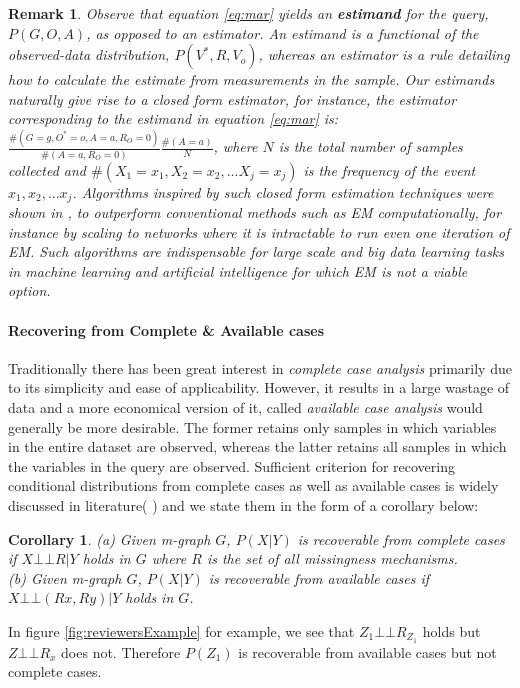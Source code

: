 \documentclass[12pt]{article}
\newcommand{\compos}{\mbox{$\bot\!\!\!\bot$}}
\newtheorem{cor}{Corollary}
\newtheorem{remark}{Remark}
\begin{document}
\begin{remark}
 Observe that equation \ref{eq:mar} yields an \textbf{estimand} for the query, $P(G,O,A)$, as opposed to an \textit{estimator}. An estimand is a functional of the observed-data distribution, $P(V^*,R,V_o)$, whereas an estimator is a rule detailing how to calculate the estimate from measurements in the sample. Our estimands naturally give rise to a closed form estimator, for instance, the estimator corresponding to the estimand in equation \ref{eq:mar} is: \\ $\frac{\#(G=g,O^*=o,A=a,R_O=0)}{\#(A=a,R_O=0)}\frac{\#(A=a)}{N}$, where $N$ is the total number of samples collected and $\#(X_1=x_1,X_2=x_2,...X_j=x_j)$ is the frequency of the event $x_1,x_2,...x_j$. 
Algorithms  inspired by such closed form estimation techniques 
were shown in \cite{mohan_learning}, to outperform conventional methods such as EM computationally, for instance by scaling to networks where it is intractable to run even one iteration of EM. Such algorithms are indispensable for large scale and big data learning tasks in machine learning and artificial intelligence for which EM is not a viable option.
\end{remark}

\paragraph{Recovering from Complete \& Available cases} Traditionally there has been great interest in \textit{complete case analysis } primarily due to its simplicity and ease of applicability. 
However, it results in a large wastage of data and
a more economical version of it, called \textit{available case analysis}
would generally be more desirable.
The former retains only samples in which
variables in the entire dataset are observed, whereas the latter retains all samples in which the variables in the query
are observed.  
Sufficient criterion for recovering
conditional distributions from complete cases as well as available cases is widely discussed in literature( \cite{bartlett2014improving, Rubin2, white2010bias}) 
and we state them in the form of a corollary below:
\begin{cor}
(a) Given m-graph $G$, $P(X|Y)$ is recoverable from
complete cases if $X \compos R|Y$ holds in $G$ where $R$ is the set of
all missingness mechanisms. \\
(b) Given m-graph $G$, $P(X|Y)$ is
recoverable from available cases if $X \compos (Rx,Ry)|Y$ holds in $G$.
\end{cor}
In figure \ref{fig:reviewersExample} for example, we see that $Z_1 \compos R_{Z_1}$ holds but $Z \compos R_x$ does not. Therefore $P(Z_1)$
is recoverable from available cases but not complete cases.
\end{document}
